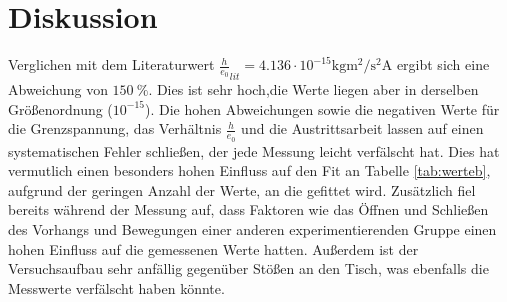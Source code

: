 \section{Diskussion}
\label{sec:Diskussion}
Verglichen mit dem Literaturwert $\frac{h}{e_0}_{lit} = 4.136 \cdot 10^{-15}
\si{\kilo\gram\meter\squared\per\second\squared\ampere}$ \cite{AP03}
ergibt sich eine Abweichung von $\SI{150}{\percent}$. Dies ist sehr hoch,die Werte liegen
aber in derselben Größenordnung ($10^{-15}$). Die hohen Abweichungen sowie die
negativen Werte für die Grenzspannung, das Verhältnis $\frac{h}{e_0}$ und die
Austrittsarbeit lassen auf einen systematischen Fehler schließen, der jede Messung
leicht verfälscht hat. Dies hat vermutlich einen besonders hohen Einfluss auf den
Fit an Tabelle \ref{tab:werteb}, aufgrund der geringen Anzahl der Werte, an die gefittet wird.
Zusätzlich fiel bereits während der Messung auf, dass Faktoren wie das Öffnen und
Schließen des Vorhangs und Bewegungen einer anderen experimentierenden Gruppe einen
hohen Einfluss auf die gemessenen Werte hatten. Außerdem ist der Versuchsaufbau
sehr anfällig gegenüber Stößen an den Tisch, was ebenfalls die Messwerte verfälscht
haben könnte.
